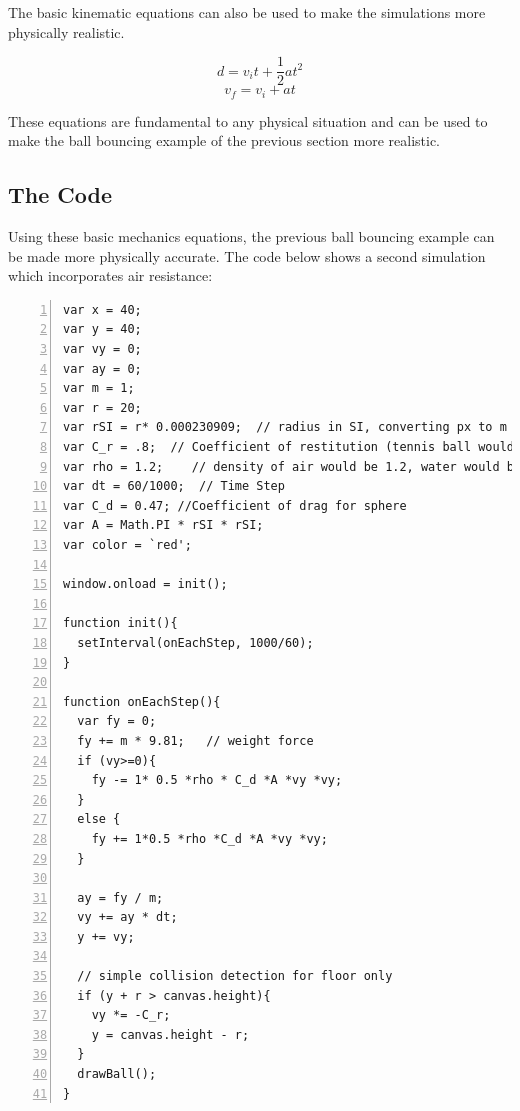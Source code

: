 The basic kinematic equations can also be used to make the simulations more physically realistic.  

\begin{equation}\label{eq:position}
d = v_i t+ \frac{1}{2}at^2
\end{equation}
\begin{equation}\label{eq:v}
v_f = v_i + at
\end{equation}

These equations are fundamental to any physical situation and can be used to make the ball bouncing example of the previous section more realistic.

\subsection{The Code}

Using these basic mechanics equations, the previous ball bouncing example can be made more physically accurate.  The code below shows a second simulation which incorporates air resistance:

\vspace{2mm}
\begin{lstlisting}[breaklines=true, frame=single, numbers=left, caption=More advanced ball bouncing simulation, label=lst:ballbounce2]
var x = 40;
var y = 40;
var vy = 0;
var ay = 0;
var m = 1;
var r = 20;
var rSI = r* 0.000230909;  // radius in SI, converting px to m
var C_r = .8;  // Coefficient of restitution (tennis ball would be .8)
var rho = 1.2;    // density of air would be 1.2, water would be 1000
var dt = 60/1000;  // Time Step
var C_d = 0.47; //Coefficient of drag for sphere
var A = Math.PI * rSI * rSI;
var color = `red';

window.onload = init();
  
function init(){
  setInterval(onEachStep, 1000/60);
}

function onEachStep(){ 
  var fy = 0;
  fy += m * 9.81;   // weight force
  if (vy>=0){
    fy -= 1* 0.5 *rho * C_d *A *vy *vy; 
  } 
  else {
    fy += 1*0.5 *rho *C_d *A *vy *vy;
  }

  ay = fy / m;
  vy += ay * dt;
  y += vy;
  
  // simple collision detection for floor only
  if (y + r > canvas.height){ 
    vy *= -C_r; 
    y = canvas.height - r;  
  }
  drawBall();
}
\end{lstlisting}


